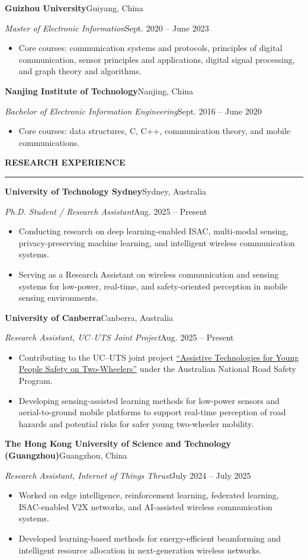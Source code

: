 \documentclass[10pt,a4paper]{article}
\newcommand{\sectionrule}[1]{
  \vspace{0.55em}
  {\large\bfseries #1\par}
  \vspace{0.20em}
  \hrule
  \vspace{0.45em}
}
\newcommand{\datedentry}[4]{
  \textbf{#1}\hfill #2\par
  \textit{#3}\hfill #4\par
}
\begin{document}
\datedentry{Guizhou University}{Guiyang, China}{Master of Electronic Information}{Sept. 2020 -- June 2023}
\begin{itemize}
  \item Core courses: communication systems and protocols, principles of digital communication, sensor principles and applications, digital signal processing, and graph theory and algorithms.
\end{itemize}

\datedentry{Nanjing Institute of Technology}{Nanjing, China}{Bachelor of Electronic Information Engineering}{Sept. 2016 -- June 2020}
\begin{itemize}
  \item Core courses: data structures, C, C++, communication theory, and mobile communications.
\end{itemize}

\sectionrule{RESEARCH EXPERIENCE}
\datedentry{University of Technology Sydney}{Sydney, Australia}{Ph.D. Student / Research Assistant}{Aug. 2025 -- Present}
\begin{itemize}
  \item Conducting research on deep learning-enabled ISAC, multi-modal sensing, privacy-preserving machine learning, and intelligent wireless communication systems.
  \item Serving as a Research Assistant on wireless communication and sensing systems for low-power, real-time, and safety-oriented perception in mobile sensing environments.
\end{itemize}

\datedentry{University of Canberra}{Canberra, Australia}{Research Assistant, UC--UTS Joint Project}{Aug. 2025 -- Present}
\begin{itemize}
  \item Contributing to the UC--UTS joint project \href{https://researchprofiles.canberra.edu.au/en/projects/assistive-technologies-for-young-people-safety-on-two-wheelers/}{``Assistive Technologies for Young People Safety on Two-Wheelers''} under the Australian National Road Safety Program.
  \item Developing sensing-assisted learning methods for low-power sensors and aerial-to-ground mobile platforms to support real-time perception of road hazards and potential risks for safer young two-wheeler mobility.
\end{itemize}

\datedentry{The Hong Kong University of Science and Technology (Guangzhou)}{Guangzhou, China}{Research Assistant, Internet of Things Thrust}{July 2024 -- July 2025}
\begin{itemize}
  \item Worked on edge intelligence, reinforcement learning, federated learning, ISAC-enabled V2X networks, and AI-assisted wireless communication systems.
  \item Developed learning-based methods for energy-efficient beamforming and intelligent resource allocation in next-generation wireless networks.
\end{itemize}
\end{document}
